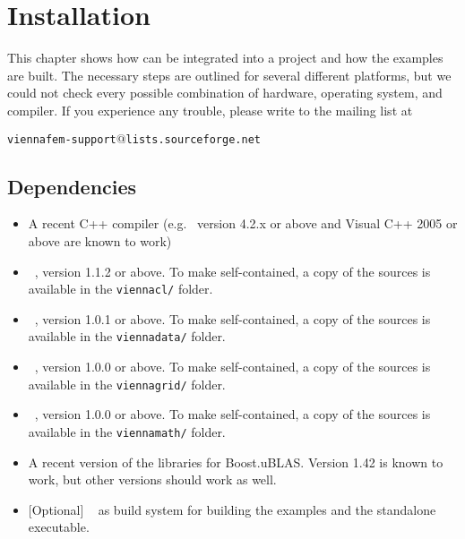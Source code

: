 \chapter{Installation}

This chapter shows how {\ViennaFEM} can be integrated into a project and how
the examples are built. The necessary steps are outlined for several different
platforms, but we could not check every possible combination of hardware,
operating system, and compiler. If you experience any trouble, please write to
the mailing list at \\
\begin{center}
\texttt{viennafem-support$@$lists.sourceforge.net}
\end{center}


\section{Dependencies}
\label{dependencies}

\begin{itemize}
 \item A recent C++ compiler (e.g.~{\GCC} version 4.2.x or above and Visual C++
2005 or above are known to work)
 \item {\ViennaCL}~\cite{ViennaCL}, version 1.1.2 or above. To make {\ViennaFEM} self-contained, a copy of the {\ViennaCL} sources is available in the \lstinline|viennacl/| folder.
 \item {\ViennaData}~\cite{ViennaData}, version 1.0.1 or above. To make {\ViennaFEM} self-contained, a copy of the {\ViennaData} sources is available in the \lstinline|viennadata/| folder.
 \item {\ViennaGrid}~\cite{ViennaGrid}, version 1.0.0 or above. To make {\ViennaFEM} self-contained, a copy of the {\ViennaGrid} sources is available in the \lstinline|viennagrid/| folder.
 \item {\ViennaMath}~\cite{ViennaMath}, version 1.0.0 or above. To make {\ViennaFEM} self-contained, a copy of the {\ViennaMath} sources is available in the \lstinline|viennamath/| folder.
 \item A recent version of the {\Boost} libraries \cite{boost} for Boost.uBLAS. Version 1.42 is known to work, but other versions should work as well.
 \item {[}Optional{]} {\CMake}~\cite{cmake} as build system for building the examples and the standalone executable.
\end{itemize}


